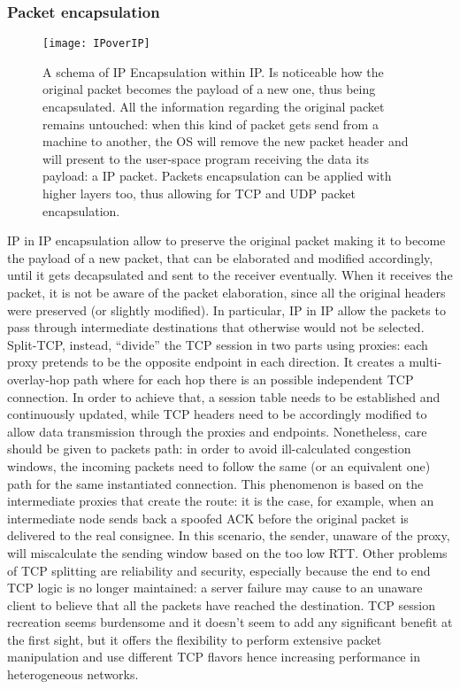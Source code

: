 \subsubsection*{Packet encapsulation}
\begin{figure}[t]
  \centering \texttt{[image: IPoverIP]}
  \caption[IP Encapsulation within IP packet schema]{A schema of IP
    Encapsulation within IP. Is noticeable how the original packet becomes the
    payload of a new one, thus being encapsulated. All the information
    regarding the original packet remains untouched: when this kind of packet
    gets send from a machine to another, the OS will remove the new packet
    header and will present to the user-space program receiving the data its
    payload: a IP packet. Packets encapsulation can be applied with higher
    layers too, thus allowing for TCP and UDP packet encapsulation.}
  \label{chap:prjan:img:ip_over_ip}
\end{figure}
IP in IP encapsulation allow to preserve the original packet making it to
become the payload of a new packet, that can be elaborated and modified
accordingly, until it gets decapsulated and sent to the receiver eventually.
When it receives the packet, it is not be aware of the packet elaboration, since
all the original headers were preserved (or slightly modified). In particular,
IP in IP allow the packets to pass through intermediate destinations that
otherwise would not be selected. Split-TCP, instead, ``divide'' the TCP session
in two parts using proxies: each proxy pretends to be the opposite endpoint in
each direction. It creates a multi-overlay-hop path where for each hop there is
an possible independent TCP connection. In order to achieve that, a session
table needs to be established and continuously updated, while TCP headers need
to be accordingly modified to allow data transmission through the proxies and
endpoints. Nonetheless, care should be given to packets path: in order to avoid
ill-calculated congestion windows, the incoming packets need to follow the same 
(or an equivalent one) path for the same instantiated connection. This
phenomenon is based on the intermediate proxies that create the route: it is the
case, for example, when an intermediate node sends back a spoofed ACK before the
original packet is delivered to the real consignee. In this scenario, the
sender, unaware of the proxy, will miscalculate the sending window based on the
too low RTT. Other problems of TCP splitting are reliability and security,
especially because the end to end TCP logic is no longer maintained: a server
failure may cause to an unaware client to believe that all the packets have
reached the destination. TCP session recreation seems burdensome and it doesn't
seem to add any significant benefit at the first sight, but it offers the
flexibility to perform extensive packet manipulation and use different TCP
flavors hence increasing performance in heterogeneous networks.

